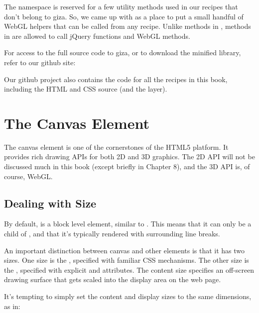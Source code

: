 The  namespace is reserved for a few utility methods used in our recipes that don't belong to giza.  So, we came up with  as a place to put a small handful of WebGL helpers that can be called from any recipe.  Unlike methods in , methods in  are allowed to call jQuery functions and WebGL methods.

For access to the full source code to giza, or to download the minified library, refer to our github site:


Our github project also contains the code for all the recipes in this book, including the HTML and CSS source (and the  layer).

\section{The Canvas Element}

The canvas element  is one of the cornerstones of the HTML5 platform.  It provides rich drawing APIs for both 2D and 3D graphics.  The 2D API will not be discussed much in this book (except briefly in Chapter 8), and the 3D API is, of course, WebGL.

\subsection{Dealing with Size}

By default,  is a block level element, similar to .  This means that it can only be a child of , and that it's typically rendered with surrounding line breaks.

An important distinction between canvas and other elements is that it has two  sizes.  One size is the , specified with familiar  CSS mechanisms.  The other size is the , specified with explicit   and   attributes.  The content size specifies an off-screen drawing surface that gets scaled into the display area on the web page.

It's tempting to simply set the content and display sizes to the same dimensions, as in:

